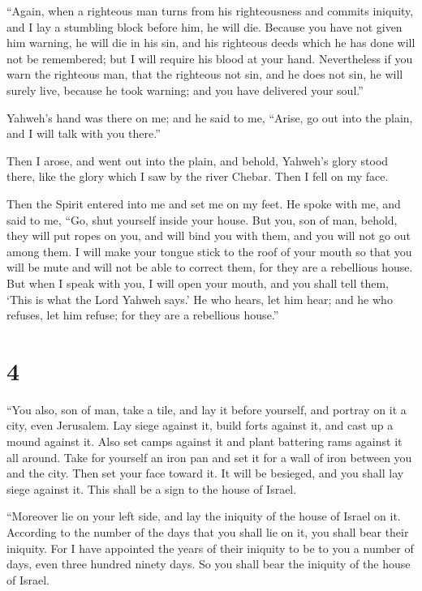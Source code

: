  ``Again, when a righteous man turns from his
righteousness and commits iniquity, and I lay a stumbling block before
him, he will die. Because you have not given him warning, he will die in
his sin, and his righteous deeds which he has done will not be
remembered; but I will require his blood at your hand. 
Nevertheless if you warn the righteous man, that the righteous not sin,
and he does not sin, he will surely live, because he took warning; and
you have delivered your soul.''

 Yahweh's hand was there on me; and he said to me,
``Arise, go out into the plain, and I will talk with you there.''

 Then I arose, and went out into the plain, and behold,
Yahweh's glory stood there, like the glory which I saw by the river
Chebar. Then I fell on my face.

 Then the Spirit entered into me and set me on my feet.
He spoke with me, and said to me, ``Go, shut yourself inside your house.
 But you, son of man, behold, they will put ropes on you,
and will bind you with them, and you will not go out among them.
 I will make your tongue stick to the roof of your mouth
so that you will be mute and will not be able to correct them, for they
are a rebellious house.  But when I speak with you, I
will open your mouth, and you shall tell them, `This is what the Lord
Yahweh says.' He who hears, let him hear; and he who refuses, let him
refuse; for they are a rebellious house.''

\hypertarget{section-3}{%
\section{4}\label{section-3}}

 ``You also, son of man, take a tile, and lay it before
yourself, and portray on it a city, even Jerusalem.  Lay
siege against it, build forts against it, and cast up a mound against
it. Also set camps against it and plant battering rams against it all
around.  Take for yourself an iron pan and set it for a
wall of iron between you and the city. Then set your face toward it. It
will be besieged, and you shall lay siege against it. This shall be a
sign to the house of Israel.

 ``Moreover lie on your left side, and lay the iniquity of
the house of Israel on it. According to the number of the days that you
shall lie on it, you shall bear their iniquity.  For I
have appointed the years of their iniquity to be to you a number of
days, even three hundred ninety days. So you shall bear the iniquity of
the house of Israel.

